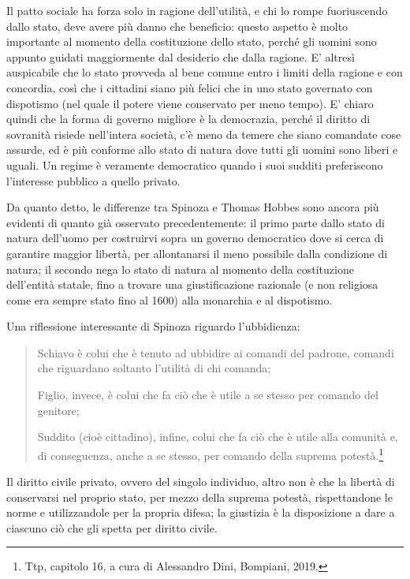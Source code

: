 Il patto sociale ha forza solo in ragione dell'utilità, e chi lo rompe fuoriuscendo dallo stato, deve avere più danno che beneficio: questo aspetto è molto importante al momento della costituzione dello stato, perché gli uomini sono appunto guidati maggiormente dal desiderio che dalla ragione. E' altresì auspicabile che lo stato provveda al bene comune entro i limiti della ragione e con concordia, così che i cittadini siano più felici che in uno stato governato con dispotismo (nel quale il potere viene conservato per meno tempo). E' chiaro quindi che la forma di governo migliore è la democrazia, perché il diritto di sovranità risiede nell'intera società, c'è meno da temere che siano comandate cose assurde, ed è più conforme allo stato di natura dove tutti gli uomini sono liberi e uguali. Un regime è veramente democratico quando i suoi sudditi preferiscono l'interesse pubblico a quello privato.

Da quanto detto, le differenze tra Spinoza e Thomas Hobbes sono ancora più evidenti di quanto già osservato precedentemente: il primo parte dallo stato di natura dell'uomo per costruirvi sopra un governo democratico dove si cerca di garantire maggior libertà, per allontanarsi il meno possibile dalla condizione di natura; il secondo nega lo stato di natura al momento della costituzione dell'entità statale, fino a trovare una giustificazione razionale (e non religiosa come era sempre stato fino al 1600) alla monarchia e al dispotismo.

Una riflessione interessante di Spinoza riguardo l'ubbidienza:
\begin{quotation}
	\small	
	Schiavo è colui che è tenuto ad ubbidire ai comandi del padrone, comandi che riguardano soltanto l'utilità di chi comanda;
	
	Figlio, invece, è colui che fa ciò che è utile a se stesso per comando del genitore;
		
	Suddito (cioè cittadino), infine, colui che fa ciò che è utile alla comunità e, di conseguenza, anche a se stesso, per comando della suprema potestà.\footnote{Ttp, capitolo 16, a cura di Alessandro Dini, Bompiani, 2019.}
	

\end{quotation}

Il diritto civile privato, ovvero del singolo individuo, altro non è che la libertà di conservarsi nel proprio stato, per mezzo della suprema potestà, rispettandone le norme e utilizzandole per la propria difesa; la giustizia è la disposizione a dare a ciascuno ciò che gli spetta per diritto civile.

